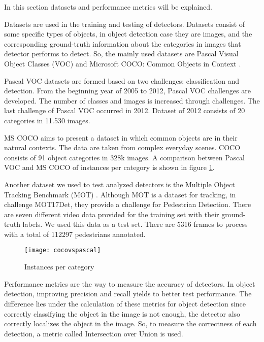 \documentclass{article}
\begin{document}
\setlength{\parindent}{6ex}

\indent

In this section datasets and performance metrics will be explained. \par 
Datasets are used in the training and testing of detectors. Datasets consist of some 
specific types of objects, in object detection case they are images, and the 
corresponding ground-truth information about the categories in images that 
detector performs to detect. So, the mainly used datasets are Pascal Visual Object 
Classes (VOC) \cite{pascalvoc} and Microsoft COCO: Common Objects in Context 
\cite{mscoco}. \par

Pascal VOC datasets are formed based on two challenges: classification and detection. From the 
beginning year of 2005 to 2012, Pascal VOC challenges are developed. The number of classes and images 
is increased through challenges. The last challenge of Pascal VOC occurred in 2012. Dataset of 
2012 consists of 20 categories in 11.530 images. \par

MS COCO aims to present a dataset in which common objects are in their natural 
contexts. The data are taken from complex everyday scenes. COCO consists of 91 
object categories in 328k images. A comparison between Pascal VOC and MS COCO 
of instances per category is shown in figure \ref{fig:cocovspascal1}. \par

Another dataset we used to test analyzed detectors is the Multiple Object Tracking Benchmark 
(MOT) \cite{mot}. Although MOT is a dataset for tracking, in challenge MOT17Det, they provide a 
challenge for Pedestrian Detection. There are seven different video data provided for 
the training set with their ground-truth labels. We used this data as a test set. There are 
5316 frames to process with a total of 112297 pedestrians annotated. 

\begin{figure}
    \centering
    \texttt{[image: cocovspascal]}
    \caption{Instances per category}
    \label{fig:cocovspascal1}
\end{figure}
\indent

Performance metrics are the way to measure the accuracy of detectors. In object 
detection, improving precision and recall yields to better test performance. The 
difference lies under the calculation of these metrics for object detection since 
correctly classifying the object in the image is not enough, the detector also correctly 
localizes the object in the image. So, to measure the correctness of each detection, 
a metric called Intersection over Union is used.
\end{document}
